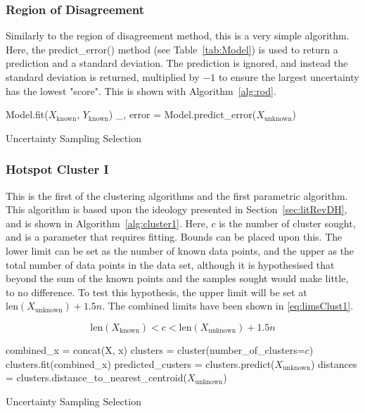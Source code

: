 \subsubsection{Region of Disagreement}
Similarly to the region of disagreement method, this is a very simple algorithm. Here, the predict\_error() method (see Table~\ref{tab:Model}) is used to return a prediction and a standard deviation. The prediction is ignored, and instead the standard deviation is returned, multiplied by $-1$ to ensure the largest uncertainty has the lowest "score". This is shown with Algorithm~\ref{alg:rod}.

\begin{algorithm}[H]
    Model.fit($X_\mathrm{known}$, $Y_\mathrm{known}$)\;
    \_, error = Model.predict\_error($X_\mathrm{unknown}$)\;
    \caption{Uncertainty Sampling Selection}
    \label{alg:rod}\SetAlgoLined
\end{algorithm}

\subsubsection{Hotspot Cluster I}
This is the first of the clustering algorithms and the first parametric algorithm. This algorithm is based upon the ideology presented in Section~\ref{sec:litRevDH}, and is shown in Algorithm~\ref{alg:cluster1}. Here, $c$ is the number of cluster sought, and is a parameter that requires fitting. Bounds can be placed upon this. The lower limit can be set as the number of known data points, and the upper as the total number of data points in the data set, although it is hypothesised that beyond the sum of the known points and the samples sought would make little, to no difference. To test this hypothesis, the upper limit will be set at $\mathrm{len}(X_\mathrm{unknown})+1.5n$. The combined limits have been shown in \ref{eq:limsClust1}.

\begin{equation}
    \label{eq:limsClust1}
    {\mathrm{len}(X_\mathrm{known})<c<\mathrm{len}(X_\mathrm{unknown})+1.5n}
\end{equation}

\begin{algorithm}[H]
    combined\_x = concat(X, x)\;
    clusters = cluster(number\_of\_clusters=$c$)\;
    clusters.fit(combined\_x)\;
    predicted\_custers = clusters.predict($X_\mathrm{unknown}$)\;
    distances = clusters.distance\_to\_nearest\_centroid($X_\mathrm{unknown}$)\;

    \caption{Uncertainty Sampling Selection}
    \label{alg:cluster1}\SetAlgoLined
\end{algorithm}

